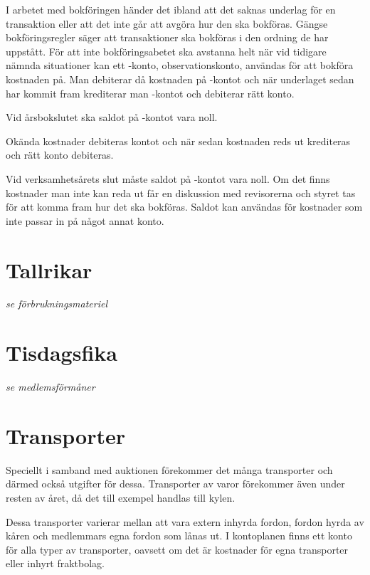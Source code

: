 				I arbetet med bokföringen händer det ibland att det saknas underlag för en transaktion eller att det inte går att avgöra hur den ska bokföras. Gängse bokföringsregler  säger att transaktioner ska bokföras i den ordning de har uppstått. För att inte bokföringsabetet ska avstanna helt när vid tidigare nämnda situationer kan ett -konto, observationskonto, användas för att bokföra kostnaden på. Man debiterar då kostnaden på -kontot och när underlaget sedan har kommit fram krediterar man -kontot och debiterar rätt konto.
		
		Vid årsbokslutet ska saldot på -kontot vara noll.
		
					\begin{redovisning}
						Okända kostnader debiteras kontot  och när sedan kostnaden reds ut krediteras  och rätt konto debiteras.
					\end{redovisning}
				
					\begin{bokslut}
						Vid verksamhetsårets slut måste saldot på -kontot vara noll. Om det finns kostnader man inte kan reda ut får en diskussion med revisorerna och styret tas för att komma fram hur det ska bokföras. Saldot  kan användas för kostnader som inte passar in på något annat konto.
					\end{bokslut}
				
				\section{Tallrikar}
				\emph{se förbrukningsmateriel}
			
				\section{Tisdagsfika}
				\emph{se medlemsförmåner}
			
				\section{Transporter}
				
				Speciellt i samband med auktionen förekommer det många transporter och därmed också utgifter för dessa. Transporter av varor förekommer även under resten av året, då det till exempel handlas till kylen.
		
		Dessa transporter varierar mellan att vara extern inhyrda fordon, fordon hyrda av kåren och medlemmars egna fordon som lånas ut. I kontoplanen finns ett konto för alla typer av transporter, oavsett om det är kostnader för egna transporter eller inhyrt fraktbolag.
		
